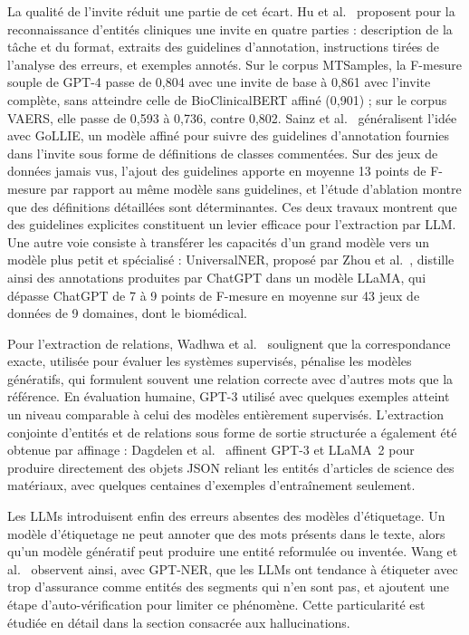 La qualité de l'invite réduit une partie de cet écart. Hu et al.~\cite{hu2024clinicalner} proposent pour la reconnaissance d'entités cliniques une invite en quatre parties : description de la tâche et du format, extraits des guidelines d'annotation, instructions tirées de l'analyse des erreurs, et exemples annotés. Sur le corpus MTSamples, la F-mesure souple de GPT-4 passe de 0,804 avec une invite de base à 0,861 avec l'invite complète, sans atteindre celle de BioClinicalBERT affiné (0,901) ; sur le corpus VAERS, elle passe de 0,593 à 0,736, contre 0,802. Sainz et al.~\cite{sainz2024gollie} généralisent l'idée avec GoLLIE, un modèle affiné pour suivre des guidelines d'annotation fournies dans l'invite sous forme de définitions de classes commentées. Sur des jeux de données jamais vus, l'ajout des guidelines apporte en moyenne 13 points de F-mesure par rapport au même modèle sans guidelines, et l'étude d'ablation montre que des définitions détaillées sont déterminantes. Ces deux travaux montrent que des guidelines explicites constituent un levier efficace pour l'extraction par LLM. Une autre voie consiste à transférer les capacités d'un grand modèle vers un modèle plus petit et spécialisé : UniversalNER, proposé par Zhou et al.~\cite{zhou2024universalner}, distille ainsi des annotations produites par ChatGPT dans un modèle LLaMA, qui dépasse ChatGPT de 7 à 9 points de F-mesure en moyenne sur 43 jeux de données de 9 domaines, dont le biomédical.

Pour l'extraction de relations, Wadhwa et al.~\cite{wadhwa2023revisiting} soulignent que la correspondance exacte, utilisée pour évaluer les systèmes supervisés, pénalise les modèles génératifs, qui formulent souvent une relation correcte avec d'autres mots que la référence. En évaluation humaine, GPT-3 utilisé avec quelques exemples atteint un niveau comparable à celui des modèles entièrement supervisés. L'extraction conjointe d'entités et de relations sous forme de sortie structurée a également été obtenue par affinage : Dagdelen et al.~\cite{dagdelen2024structured} affinent GPT-3 et LLaMA~2 pour produire directement des objets JSON reliant les entités d'articles de science des matériaux, avec quelques centaines d'exemples d'entraînement seulement.

Les LLMs introduisent enfin des erreurs absentes des modèles d'étiquetage. Un modèle d'étiquetage ne peut annoter que des mots présents dans le texte, alors qu'un modèle génératif peut produire une entité reformulée ou inventée. Wang et al.~\cite{wang2025gptner} observent ainsi, avec GPT-NER, que les LLMs ont tendance à étiqueter avec trop d'assurance comme entités des segments qui n'en sont pas, et ajoutent une étape d'auto-vérification pour limiter ce phénomène. Cette particularité est étudiée en détail dans la section consacrée aux hallucinations.

